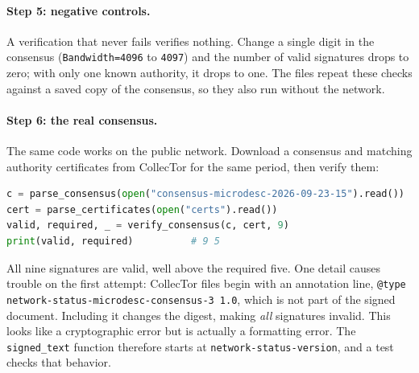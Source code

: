 \paragraph{Step 5: negative controls.} A verification that never fails verifies nothing. Change a single digit in the consensus (\texttt{Bandwidth=4096} to \texttt{4097}) and the number of valid signatures drops to zero; with only one known authority, it drops to one. The  files repeat these checks against a saved copy of the consensus, so they also run without the network.

\paragraph{Step 6: the real consensus.} The same code works on the public network. Download a consensus and matching authority certificates from CollecTor for the same period, then verify them:
\begin{lstlisting}[language=Python,numbers=none]
c = parse_consensus(open("consensus-microdesc-2026-09-23-15").read())
cert = parse_certificates(open("certs").read())
valid, required, _ = verify_consensus(c, cert, 9)
print(valid, required)          # 9 5
\end{lstlisting}
All nine signatures are valid, well above the required five. One detail causes trouble on the first attempt: CollecTor files begin with an annotation line, \texttt{@type network-status-microdesc-consensus-3 1.0}, which is not part of the signed document. Including it changes the digest, making \emph{all} signatures invalid. This looks like a cryptographic error but is actually a formatting error. The \texttt{signed\_text} function therefore starts at \texttt{network-status-version}, and a test checks that behavior.


